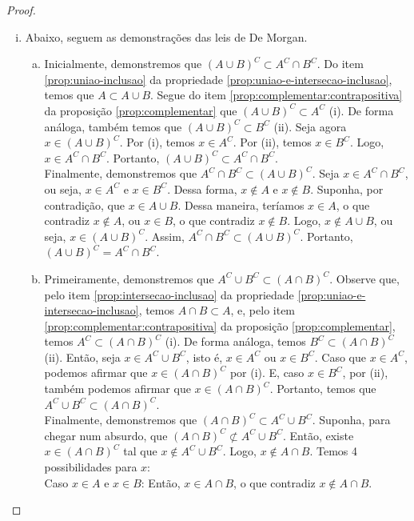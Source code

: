 \begin{proof}
\begin{enumerate}[i)]
    \item Abaixo, seguem as demonstrações das leis de De Morgan.
        \begin{enumerate}[a)]
            \item
                Inicialmente, demonstremos que $(A \cup B)^C \subset A^C \cap B^C$. Do item \ref{prop:uniao-inclusao} da propriedade \ref{prop:uniao-e-intersecao-inclusao}, temos que $A \subset A \cup B$. Segue do item \ref{prop:complementar:contrapositiva} da proposição \ref{prop:complementar} que $(A \cup B)^C \subset A^C$ (i). De forma análoga, também temos que $(A \cup B)^C \subset B^C$ (ii). Seja agora $x \in (A \cup B)^C$. Por (i), temos $x \in A^C$. Por (ii), temos $x \in B^C$. Logo, $x \in A^C \cap B^C$. Portanto, $(A \cup B)^C \subset A^C \cap B^C$. \\
                Finalmente, demonstremos que $A^C \cap B^C \subset (A \cup B)^C$. Seja $x \in A^C \cap B^C$, ou seja, $x \in A^C$ e $x \in B^C$. Dessa forma, $x \not\in A$ e $x \not\in B$. Suponha, por contradição, que $x \in A \cup B$. Dessa maneira, teríamos $x \in A$, o que contradiz $x \not\in A$, ou $x \in B$, o que contradiz $x \not\in B$. Logo, $x \not\in A \cup B$, ou seja, $x \in (A \cup B)^C$. Assim, $A^C \cap B^C \subset (A \cup B)^C$. Portanto, $(A \cup B)^C = A^C \cap B^C$.
            \item
                Primeiramente, demonstremos que $A^C \cup B^C \subset (A \cap B)^C$. Observe que, pelo item \ref{prop:intersecao-inclusao} da propriedade \ref{prop:uniao-e-intersecao-inclusao}, temos $A \cap B \subset A$, e, pelo item \ref{prop:complementar:contrapositiva} da proposição \ref{prop:complementar}, temos $A^C \subset (A \cap B)^C$ (i). De forma análoga, temos $B^C \subset (A \cap B)^C$ (ii). Então, seja $x \in A^C \cup B^C$, isto é, $x \in A^C$ ou $x \in B^C$. Caso que $x \in A^C$, podemos afirmar que $x \in (A \cap B)^C$ por (i). E, caso $x \in B^C $, por (ii), também podemos afirmar que $x \in (A \cap B)^C$. Portanto, temos que $A^C \cup B^C \subset (A \cap B)^C$. \\
                Finalmente, demonstremos que $(A \cap B)^C \subset A^C \cup B^C$. Suponha, para chegar num absurdo, que $(A \cap B)^C \not\subset A^C \cup B^C$. Então, existe $x \in (A \cap B)^C$ tal que $x \not\in A^C \cup B^C$. Logo, $x \not\in A \cap B$. Temos 4 possibilidades para $x$: \\
                Caso $x \in A$ e $x \in B$: Então, $x \in A \cap B$, o que contradiz $x \not\in A \cap B$. \\

\end{enumerate}
\end{enumerate}
\end{proof}
